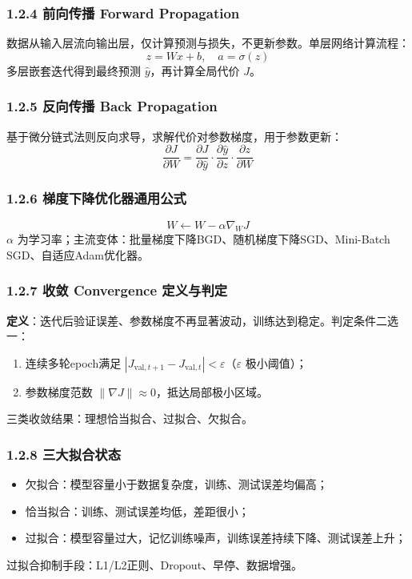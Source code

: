 \documentclass[11pt,a4paper]{article}
\begin{document}
\subsubsection{1.2.4 前向传播 Forward Propagation}
数据从输入层流向输出层，仅计算预测与损失，不更新参数。单层网络计算流程：
\[
z=Wx+b,\quad a=\sigma(z)
\]
多层嵌套迭代得到最终预测 $\hat{y}$，再计算全局代价 $J$。

\subsubsection{1.2.5 反向传播 Back Propagation}
基于微分链式法则反向求导，求解代价对参数梯度，用于参数更新：
\[
\frac{\partial J}{\partial W} = \frac{\partial J}{\partial \hat{y}} \cdot \frac{\partial \hat{y}}{\partial z} \cdot \frac{\partial z}{\partial W}
\]

\subsubsection{1.2.6 梯度下降优化器通用公式}
\[
W \leftarrow W - \alpha \nabla_W J
\]
$\alpha$ 为学习率；主流变体：批量梯度下降BGD、随机梯度下降SGD、Mini-Batch SGD、自适应Adam优化器。

\subsubsection{1.2.7 收敛 Convergence 定义与判定}
\textbf{定义}：迭代后验证误差、参数梯度不再显著波动，训练达到稳定。判定条件二选一：
\begin{enumerate}
\item 连续多轮epoch满足 $|J_{\text{val},t+1}-J_{\text{val},t}|<\varepsilon$（$\varepsilon$ 极小阈值）；
\item 参数梯度范数 $\|\nabla J\|\approx 0$，抵达局部极小区域。
\end{enumerate}
三类收敛结果：理想恰当拟合、过拟合、欠拟合。

\subsubsection{1.2.8 三大拟合状态}
\begin{itemize}
\item 欠拟合：模型容量小于数据复杂度，训练、测试误差均偏高；
\item 恰当拟合：训练、测试误差均低，差距很小；
\item 过拟合：模型容量过大，记忆训练噪声，训练误差持续下降、测试误差上升；
\end{itemize}
过拟合抑制手段：L1/L2正则、Dropout、早停、数据增强。
\end{document}
